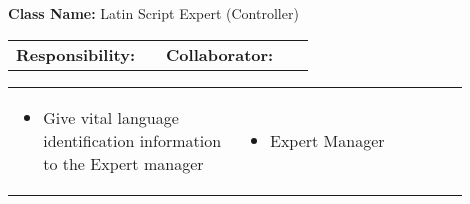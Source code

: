 \begin{cards}[]
    \textbf{Class Name:} Latin Script Expert (Controller)
    \tcbline
    \begin{tabular}{p{0.45\linewidth} | p{0.45\linewidth}}
        \textbf{Responsibility:}& 
        \textbf{Collaborator:}\\
    \end{tabular}
    \tcbline
    \begin{tabular}{p{0.45\linewidth} | p{0.45\linewidth}}
        \begin{itemize}
            \item Give vital language identification information to the Expert manager
        \end{itemize}
        &
        \begin{itemize}
            \item Expert Manager
        \end{itemize}
    \end{tabular}
\end{cards}